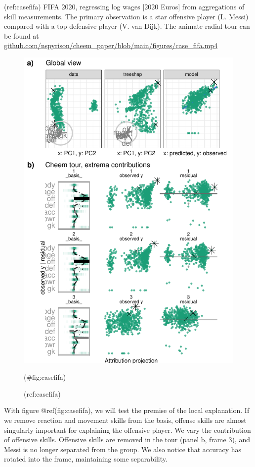 \documentclass[
]{article}
\begin{document}
(ref:casefifa) FIFA 2020, regressing log wages {[}2020 Euros{]} from
aggregations of skill measurements. The primary observation is a star
offensive player (L. Messi) compared with a top defensive player (V. van
Dijk). The animate radial tour can be found at
\href{https://github.com/nspyrison/cheem_paper/blob/main/figures/case_fifa.mp4}{github.com/nspyrison/cheem\_paper/blob/main/figures/case\_fifa.mp4}

\begin{figure}

{\centering \includegraphics[width=1\linewidth]{./figures/case_fifa} 

}

\caption{(ref:casefifa)}(\#fig:casefifa)
\end{figure}

With figure @ref(fig:casefifa), we will test the premise of the local
explanation. If we remove reaction and movement skills from the basis,
offense skills are almost singularly important for explaining the
offensive player. We vary the contribution of offensive skills.
Offensive skills are removed in the tour (panel b, frame 3), and Messi
is no longer separated from the group. We also notice that accuracy has
rotated into the frame, maintaining some separability.
\end{document}
